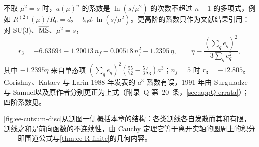 不取 $\mu^2=s$ 时，$a(\mu)^n$ 的系数是 $\ln(s/\mu^2)$ 的次数不超过 $n-1$ 的多项式，例如 $R^{(2)}(\mu)/R_0=d_2-b_0d_1\ln(s/\mu^2)$。更高阶的系数只作为文献结果引用：对 SU(3)、$\overline{\rm MS}$、$\mu^2=s$，
\begin{equation}\label{eq:ee-r3}
r_3=-6.63694-1.20013\,n_f-0.00518\,n_f^2-1.2395\,\eta,\qquad \eta\equiv\frac{(\sum_qe_q)^2}{3\sum_qe_q^2},
\end{equation}
其中 $-1.2395\eta$ 来自单态项 $(\sum_qe_q)^2(\frac{55}{72}-\frac53\zeta_3)a^3$\cite{GorishniiKataevLarin1991,SurguladzeSamuel1991}；$n_f=5$ 时 $r_3=-12.805$。Gorishny、Kataev 与 Larin 1988 年发表的 $a^3$ 系数\cite{Gorishnii:1988bc}有误，1991 年由 Surguladze 与 Samuel\cite{SurguladzeSamuel1991}以及原作者\cite{GorishniiKataevLarin1991}分别更正为上式（附录~Q 第~20~条，\cref{sec:appQ-errata}）；四阶系数见\cite{BaikovChetyrkinKuhn2008}。

\cref{fig:ee-cutsum-disc}从割图一侧概括本章的结构：各类割线各自发散而其和有限，割线之和是前向函数的不连续性，由 Cauchy 定理它等于离开实轴的圆周上的积分——即围道公式与\cref{thm:ee-R-finite}的几何内容。

